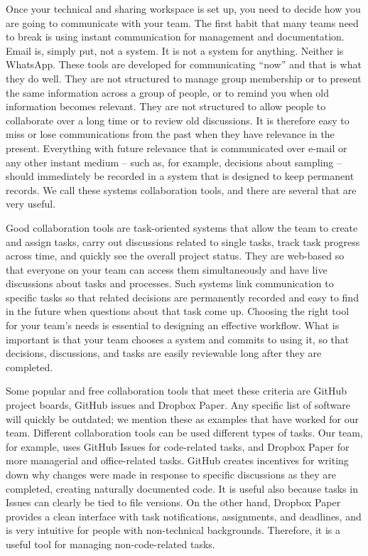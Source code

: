 Once your technical and sharing workspace is set up,
you need to decide how you are going to communicate with your team.
The first habit that many teams need to break
is using instant communication for management and documentation.
Email is, simply put, not a system. It is not a system for anything. Neither is WhatsApp.
These tools are developed for communicating ``now'' and that is what they do well.
They are not structured to manage group membership or to present the same information
across a group of people, or to remind you when old information becomes relevant.
They are not structured to allow people to collaborate over a long time or to review old discussions.
It is therefore easy to miss or lose communications from the past when they have relevance in the present.
Everything with future relevance that is communicated over e-mail or any other instant medium
-- such as, for example, decisions about sampling --
should immediately be recorded in a system that is designed to keep permanent records.
We call these systems collaboration tools, and there are several that are very useful.

Good collaboration tools are task-oriented systems 
that allow the team to create and assign tasks,
carry out discussions related to single tasks,
track task progress across time, and quickly see the overall project status.
They are web-based so that everyone on your team can access them simultaneously
and have live discussions about tasks and processes.
Such systems link communication to specific tasks so that
related decisions are permanently recorded
and easy to find in the future when questions about that task come up.
Choosing the right tool for your team's needs is essential to designing an effective workflow.
What is important is that your team chooses a system and commits to using it,
so that decisions, discussions, and tasks are easily reviewable long after they are completed.

Some popular and free collaboration tools that meet these criteria are 
GitHub project boards, GitHub issues and Dropbox Paper.
Any specific list of software will quickly be outdated;
we mention these as examples that have worked for our team.
Different collaboration tools can be used different types of tasks.
Our team, for example, uses GitHub Issues for code-related tasks,
and Dropbox Paper for more managerial and office-related tasks.
GitHub creates incentives for writing down why changes were made
in response to specific discussions
as they are completed, creating naturally documented code.
It is useful also because tasks in Issues can clearly be tied to file versions.
On the other hand, Dropbox Paper provides a clean interface with task notifications,
assignments, and deadlines,
and is very intuitive for people with non-technical backgrounds.
Therefore, it is a useful tool for managing non-code-related tasks.

